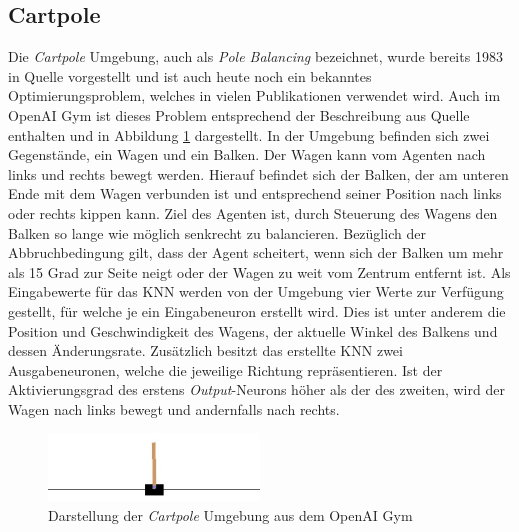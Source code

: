 \subsection{Cartpole}
Die \emph{Cartpole} Umgebung, auch als \emph{Pole Balancing} bezeichnet, wurde bereits 1983 in Quelle \cite{barto1983neuronlike} vorgestellt und ist auch heute noch ein bekanntes Optimierungsproblem, welches in vielen Publikationen verwendet wird. Auch im OpenAI Gym ist dieses Problem entsprechend der Beschreibung aus Quelle \cite{barto1983neuronlike} enthalten und in Abbildung \ref{fig:cartpole_environment} dargestellt. In der Umgebung befinden sich zwei Gegenstände, ein Wagen und ein Balken. Der Wagen kann vom Agenten nach links und rechts bewegt werden. Hierauf befindet sich der Balken, der am unteren Ende mit dem Wagen verbunden ist und entsprechend seiner Position nach links oder rechts kippen kann. Ziel des Agenten ist, durch Steuerung des Wagens den Balken so lange wie möglich senkrecht zu balancieren. Bezüglich der Abbruchbedingung gilt, dass der Agent scheitert, wenn  sich der Balken um mehr als 15 Grad zur Seite neigt oder der Wagen zu weit vom Zentrum entfernt ist. Als Eingabewerte für das \ac{KNN} werden von der Umgebung vier Werte zur Verfügung gestellt, für welche je ein Eingabeneuron erstellt wird. Dies ist unter anderem die Position und Geschwindigkeit des Wagens, der aktuelle Winkel des Balkens und dessen Änderungsrate. Zusätzlich besitzt das erstellte \ac{KNN} zwei Ausgabeneuronen, welche die jeweilige Richtung repräsentieren. Ist der Aktivierungsgrad des erstens \emph{Output}-Neurons höher als der des zweiten, wird der Wagen nach links bewegt und andernfalls nach rechts.
\begin{figure}[!h]
	\centering
	\includegraphics[width=0.5\textwidth]{./img/cartpole_env.JPG} 
	\caption{Darstellung der \emph{Cartpole} Umgebung aus dem OpenAI Gym}
	\label{fig:cartpole_environment}
\end{figure} 
